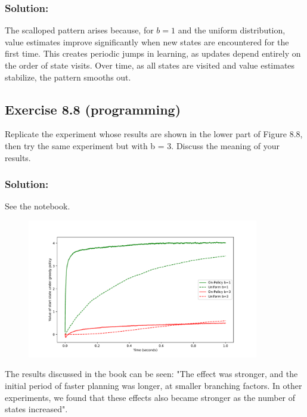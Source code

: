 \subsubsection*{Solution:}

The scalloped pattern arises because, for $b=1$ and the uniform distribution, value estimates improve significantly when new states are encountered for the first time. This creates periodic jumps in learning, as updates depend entirely on the order of state visits. Over time, as all states are visited and value estimates stabilize, the pattern smooths out.

\subsection*{Exercise 8.8 (programming)}
Replicate the experiment whose results are shown in the
lower part of Figure 8.8, then try the same experiment but with b = 3. Discuss the
meaning of your results.

\subsubsection*{Solution:}
See the notebook.

\begin{figure}[H]
    \centering
    \includegraphics[width=0.9\textwidth]{chapters_latex/figures/ex_08_08.pdf}
    \captionsetup{labelformat=empty}
\end{figure}

The results discussed in the book can be seen: "The effect was stronger, and the initial period of faster planning was longer, at smaller branching factors. In other experiments, we found that these effects also became stronger as the number of states increased".